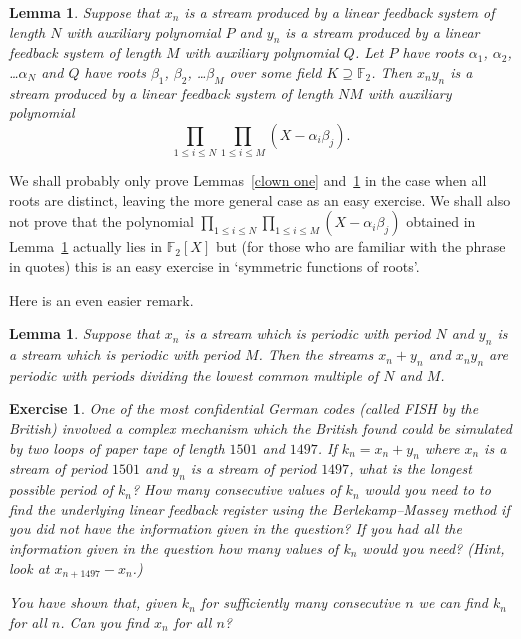 \documentclass[12pt,a4paper]{article}
\theoremstyle{plain}
\newtheorem{lemma}[theorem]{Lemma}
\newtheorem{exercise}[theorem]{Exercise}
\theoremstyle{definition}
\begin{document}
    \begin{lemma}
        \label{clown two}
        Suppose that $x_{n}$ is a stream
        produced by a linear feedback system of length $N$
        with auxiliary
        polynomial $P$ and $y_{n}$  is a stream
        produced by a linear feedback system of length $M$
        with auxiliary polynomial $Q$.
        Let  $P$ have roots $\alpha_{1}$, $\alpha_{2}$,
        \dots $\alpha_{N}$ and $Q$ have roots
        $\beta_{1}$, $\beta_{2}$,
        \dots $\beta_{M}$ over some field $K\supseteq {\mathbb F}_{2}$.
        Then $x_{n}y_{n}$ is a stream produced by
        a linear feedback system of length $NM$
        with auxiliary polynomial
        \[\prod_{1\leq i\leq N}\prod_{1\leq i\leq M}(X-\alpha_{i}\beta_{j}).\]
    \end{lemma}
    \noindent
    We shall probably only prove Lemmas~\ref{clown one}
    and~\ref{clown two} in the case when all roots are
    distinct, leaving the more general case as an
    easy exercise. We shall also not prove that
    the polynomial
    $\prod_{1\leq i\leq N}\prod_{1\leq i\leq M}(X-\alpha_{i}\beta_{j})$
    obtained in Lemma~\ref{clown two}
    actually lies in ${\mathbb F}_{2}[X]$ but (for those who
    are familiar with the phrase in quotes)
    this is an easy exercise
    in `symmetric functions of roots'.

    Here is an even easier remark.
    \begin{lemma}
        \label{clown three}
        Suppose that $x_{n}$ is a stream
        which is periodic with period $N$
        and $y_{n}$ is a stream which is periodic
        with period $M$. Then the streams
        $x_{n}+y_{n}$ and $x_{n}y_{n}$
        are periodic with periods dividing
        the lowest common multiple of $N$ and $M$.
    \end{lemma}
    \begin{exercise}
        \label{Fish}
        One of the most confidential
        German codes (called FISH by the British)
        involved a complex mechanism which
        the British found could be simulated
        by two loops of paper tape of
        length $1501$ and $1497$. If $k_{n}=x_{n}+y_{n}$
        where $x_{n}$ is a stream of period $1501$
        and $y_{n}$ is a stream of period $1497$,
        what is the longest possible period of $k_{n}$?
        How many consecutive values of $k_{n}$ would you
        need to to find the underlying linear feedback register
        using the Berlekamp--Massey method if you did
        not have the information given in the question?
        If you had
        all the information given in the question
        how many values of $k_{n}$ would you need?
        (Hint, look at $x_{n+1497}-x_{n}$.)

        You have shown that, given $k_{n}$ for sufficiently
        many consecutive $n$ we can find $k_{n}$ for all $n$.
        Can you find $x_{n}$ for all $n$?
    \end{exercise}
\end{document}
